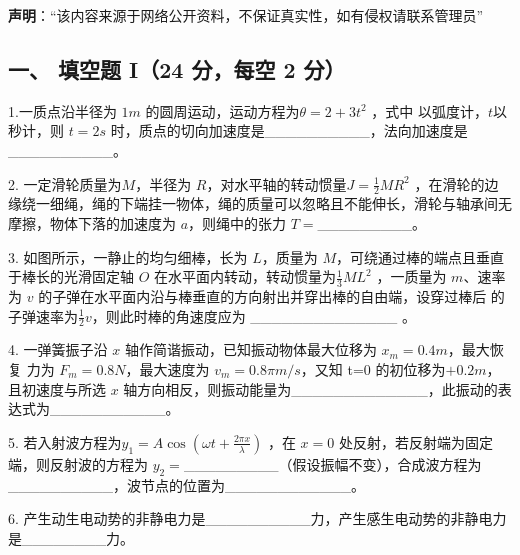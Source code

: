 
\textbf{声明}：“该内容来源于网络公开资料，不保证真实性，如有侵权请联系管理员”

\subsection{一、 填空题 I（24 分，每空 2 分）}
1.一质点沿半径为 $1m$ 的圆周运动，运动方程为$\theta=2+3t^2$ ，式中 以弧度计，$t$以秒计，则 $t=2s$ 时，质点的切向加速度是__________，法向加速度是__________。

2. 一定滑轮质量为$M$，半径为 $R$，对水平轴的转动惯量$J=\frac{1}{2}MR^2$ ，在滑轮的边缘绕一细绳，绳的下端挂一物体，绳的质量可以忽略且不能伸长，滑轮与轴承间无摩擦，物体下落的加速度为 $a$，则绳中的张力 $T=$_________。

3. 如图所示，一静止的均匀细棒，长为 $L$，质量为 $M$，可绕通过棒的端点且垂直于棒长的光滑固定轴 $O$ 在水平面内转动，转动惯量为$\frac{1}{3}ML^2$ ，一质量为 $m$、速率为 $v$ 的子弹在水平面内沿与棒垂直的方向射出并穿出棒的自由端，设穿过棒后 的子弹速率为$\frac{1}{2}v$，则此时棒的角速度应为 ______________ 。

4. 一弹簧振子沿 $x$ 轴作简谐振动，已知振动物体最大位移为 $x_m=0.4m$，最大恢复
力为 $F_m=0.8N$，最大速度为 $v_m=0.8\pi m/s$，又知 t=0 的初位移为$+0.2m$，且初速度与所选 $x$ 轴方向相反，则振动能量为_____________，此振动的表达式为___________。

5. 若入射波方程为$y_1=A\cos(\omega t+\frac{2\pi x}{\lambda})$ ，在 $x=0$ 处反射，若反射端为固定端，则反射波的方程为 $y_2=$_________（假设振幅不变），合成波方程为__________，波节点的位置为____________。

6. 产生动生电动势的非静电力是__________力，产生感生电动势的非静电力是________力。
